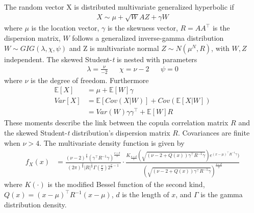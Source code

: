 The random vector X is distributed multivariate generalized hyperbolic if
\begin{align}
    X \sim \mu + \sqrt{W} A Z + \gamma W
\end{align}
where $\mu$ is the location vector, $\gamma$ is the skewness vector, $R = A A^\top$ is the dispersion matrix, $W$ follows a generalized inverse-gamma distribution $W \sim GIG(\lambda, \chi, \psi)$ and Z is multivariate normal $Z \sim N(\mu^N, R)$, with $W, Z$ independent. The skewed Student-\textit{t} is nested with parameters
\begin{align}
    \lambda = \frac{\nu}{-2} && \chi = \nu - 2 && \psi = 0
\end{align}
where $\nu$ is the degree of freedom. Furthermore
\begin{align}
    \mathbb{E}[X] &= \mu + \mathbb{E}[W] \gamma \\
    Var[X] &= \mathbb{E}[Cov(X|W)] + Cov(\mathbb{E}[X|W]) \\
    &= Var(W) \gamma \gamma^\top + \mathbb{E}[W] R \nonumber
\end{align}
These moments describe the link between the copula correlation matrix $R$ and the skewed Student-\textit{t} distribution's dispersion matrix $R$. Covariances are finite when $\nu > 4$. The multivariate density function is given by
\begin{align} \label{eq:dskewt}
    f_X(x) &= \frac{(\nu - 2)^\frac{\nu}{2} (\gamma^\top R^{-1} \gamma)^{\frac{\nu+d}{2}}}{(2 \pi)^{\frac{d}{2}} |R|^\frac{1}{2} \Gamma (\frac{\nu}{2}) 2^{\frac{\nu}{2} - 1}} \cdot \frac{K_{\frac{\nu + d}{2}} ( \sqrt{(\nu - 2 + Q(x)) \gamma^\top R^{-1} \gamma}) e^{(x-\mu)^\top R^{-1} \gamma} )}{( \sqrt{(\nu - 2 + Q(x)) \gamma^\top R^{-1} \gamma})^{\frac{\nu + d}{2}}}
\end{align}
where $K(\cdot)$ is the modified Bessel function of the second kind, $Q(x) = (x-\mu)^\top R^{-1} (x-\mu)$, $d$ is the length of $x$, and $\Gamma$ is the gamma distribution density.

\newpage

